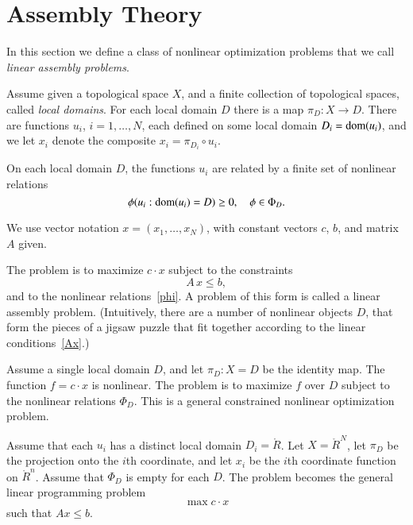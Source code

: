 \section{Assembly Theory} \label{linear}




In this section we define a class of nonlinear optimization
problems that we call {\it linear assembly problems}.

Assume given a topological space $X$, and a finite collection of
topological spaces, called {\it local domains}.  For each local
domain $D$ there is a map $\pi_D:X\to D$.  There are functions
$u_i$, $i=1,\ldots,N$, each defined on some local domain $D_i =
{\operatorname{dom}}(u_i)$, and we let $x_i$ denote the composite $x_i =
\pi_{D_i}\circ u_i$.

On each local domain $D$, the functions $u_i$ are related by a
finite set of nonlinear relations
\begin{equation}\phi(u_i : {\operatorname{dom}}(u_i) = D) \ge0, \quad \phi \in \Phi_D.
    \label{phi}
\end{equation}

We use vector notation $x = (x_1,\ldots,x_N)$, with constant
vectors $c$, $b$, and matrix $A$ given.

The problem is to maximize $c\cdot x$ subject to the constraints
    \begin{equation}\label{Ax}A\, x \le b,
    \end{equation}
and to the nonlinear relations~\ref{phi}.  A problem of this form
is called a linear assembly problem.  (Intuitively, there are a
number of nonlinear objects $D$, that form the pieces of a jigsaw
puzzle that fit together according to the linear
conditions~\ref{Ax}.)

\begin{example}
Assume a single local domain $D$, and let $\pi_D:X=D$ be the
identity map.  The function $f = c\cdot x $ is nonlinear. The
problem is to maximize $f$ over $D$ subject to the nonlinear
relations $\Phi_D$.  This is a general constrained nonlinear
optimization problem.
\end{example}

\begin{example}  Assume that each $u_i$ has a distinct local domain $D_i = \ring{R}$.
Let $X = \ring{R}^N$, let $\pi_D$ be the projection onto the $i$th
coordinate, and let $x_i$ be the $i$th coordinate function on
$\ring{R}^n$. Assume that $\Phi_D$ is empty for each $D$.  The
problem becomes the general linear programming problem
    $$\max c\cdot x$$
such that $A x\le b$.
\end{example}

